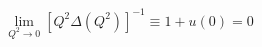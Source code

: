 \begin{equation}
 \lim_{Q^2 \rightarrow 0} [Q^2 \Delta(Q^2)]^{-1} \equiv 1+u(0) = 0
\end{equation}

